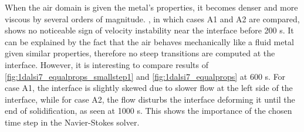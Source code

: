 When the air domain is given the metal's properties, it becomes denser and more viscous by several orders of magnitude. 
, in which cases A1 and A2 are compared, shows no noticeable sign of velocity instability near the interface before 200 s.
It can be explained by the fact that the air behaves mechanically like a fluid metal given similar properties, 
therefore no steep transitions are computed at the interface. 
However, it is interesting to compare results of \cref{fig:1dalsi7_equalprops_smallstep1} and \cref{fig:1dalsi7_equalprops} at 600 s.
For case A1, the interface is slightly skewed due to slower flow at the left side of the interface, while for case A2, the flow disturbs
the interface deforming it until the end of solidification, as seen at 1000 s. This shows the importance of the chosen time step
in the Navier-Stokes solver. 

